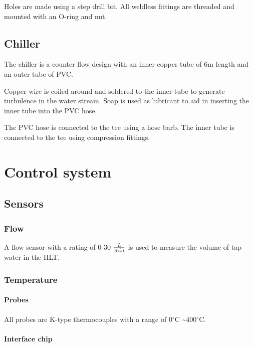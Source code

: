 \documentclass[11pt,fleqn,openany]{book} %
\newcommand{\degree}{\ensuremath{^\circ}}
\begin{document}
Holes are made using a step drill bit. All weldless fittings are threaded and mounted with an O-ring and nut.

\section{Chiller}

The chiller is a counter flow design with an inner copper tube of 6m length and an outer tube of PVC.

Copper wire is coiled around and soldered to the inner tube to generate turbulence in the water stream. Soap is used as lubricant to aid in inserting the inner tube into the PVC hose.

The PVC hose is connected to the tee using a hose barb. The inner tube is connected to the tee using compression fittings.



\chapter{Control system}

\section{Sensors}

\subsection{Flow}

A flow sensor with a rating of 0-30 $L \over min$ is used to measure the volume of tap water in the HLT.

\subsection{Temperature}

\subsubsection{Probes}

All probes are K-type thermocouples with a range of $0\degree$C \textasciitilde $400\degree$C.

\subsubsection{Interface chip}
\end{document}
